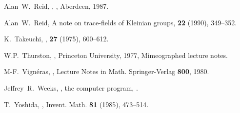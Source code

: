 \documentclass[a4paper]{amsart}
\theoremstyle{definition}
\begin{document}
\begin{thebibliography}{99}
Alan~W.~Reid,
,
, Aberdeen, 1987.

Alan~W.~Reid,
\newblock A note on trace-fields of {Kleinian} groups,
 {\bf 22} (1990), 349--352.

K.~Takeuchi,
,
 {\bf 27} (1975), 600--612.

W.P.~Thurston,
,
\newblock Princeton University, 1977,
\newblock Mimeographed lecture notes.

M-F.~Vign\'{e}ras,
,
\newblock Lecture Notes in Math. Springer-Verlag {\bf 800}, 1980.

Jeffrey~R.~Weeks,
, the computer program,
.

T.~Yoshida,
,
\newblock Invent. Math. {\bf81} (1985), 473--514.

\end{thebibliography}
\end{document}

